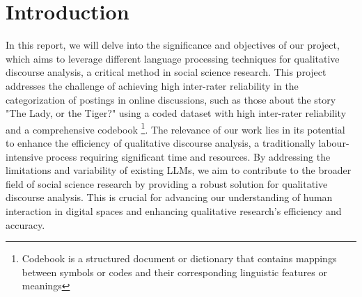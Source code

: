 \documentclass[fleqn,moreauthors,10pt]{ds_report}
\affiliation{\textit{Advisors: Slavko Žitnik}}
\begin{document}
\flushbottom 

\maketitle 

\thispagestyle{empty} 


\section*{Introduction}
	
In this report, we will delve into the significance and objectives of our project, which aims to leverage different language processing techniques for qualitative discourse analysis, a critical method in social science research. This project addresses the challenge of achieving high inter-rater reliability in the categorization of postings in online discussions, such as those about the story "The Lady, or the Tiger?" using a coded dataset with high inter-rater
reliability and a comprehensive codebook \footnote{Codebook is a structured document or dictionary that contains mappings between symbols or codes and their corresponding linguistic features or meanings}. The relevance of our work lies in its potential to enhance the efficiency of qualitative discourse analysis, a traditionally labour-intensive process requiring significant time and resources. By addressing the limitations and variability of existing LLMs, we aim to contribute to the broader field of social science research by providing a robust solution for qualitative discourse analysis. This is crucial for advancing our understanding of human interaction in digital spaces and enhancing qualitative research's efficiency and accuracy.
\end{document}
